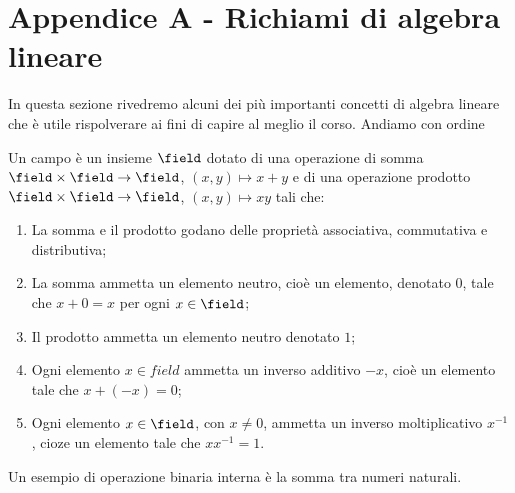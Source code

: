 \chapter{Appendice A - Richiami di algebra lineare}
\label{sec:algebra}
In questa sezione rivedremo alcuni dei più importanti concetti di algebra lineare che è utile rispolverare ai fini di capire al meglio il corso.
Andiamo con ordine

\begin{definition} [Campo]
	Un campo è un insieme $\field$ dotato di una operazione di somma $\field \times \field \rightarrow \field$, $(x, y) \mapsto x + y$ e di una operazione prodotto $\field \times \field \rightarrow \field$, $(x, y) \mapsto xy$ tali che:
	\begin{enumerate}
		\renewcommand{\labelenumi}{\roman{enumi}.}
		\item La somma e il prodotto godano delle proprietà associativa, commutativa e distributiva;
		\item La somma ammetta un elemento neutro, cioè un elemento, denotato $0$, tale che $x + 0 = x$ per ogni $x \in \field$;
		\item Il prodotto ammetta un elemento neutro denotato $1$;
		\item Ogni elemento $x \in field$ ammetta un inverso additivo $-x$, cioè un elemento tale che $x + (-x) = 0$;
		\item Ogni elemento $x \in \field$, con $x \neq 0$, ammetta un inverso moltiplicativo $x^{-1}$, cioze un elemento tale che $xx^{-1} = 1$.
	\end{enumerate}
\end{definition}
Un esempio di operazione binaria interna è la somma tra numeri naturali.
